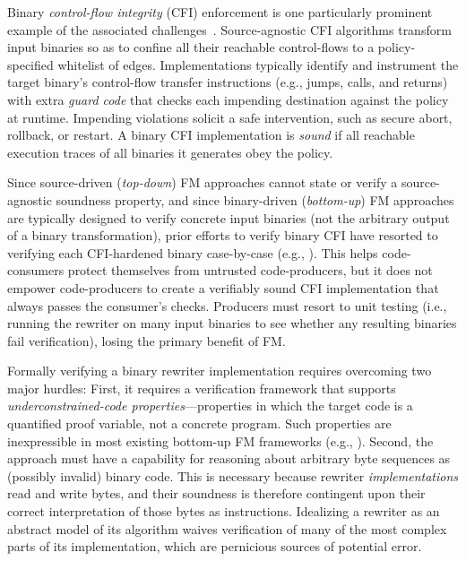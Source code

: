 {    Binary \emph{control-flow integrity} (CFI) enforcement is one particularly prominent example of the associated challenges~\cite{safedispatch,typearmor,object_flow_integrity,fineibt,renewablejitcfi,eccut,resource_constrained_cfi,fixingfineibt}.
    Source-agnostic CFI algorithms transform input binaries so as to confine all their reachable control-flows to a policy-specified whitelist of edges.
    Implementations typically identify and instrument the target binary's control-flow transfer instructions (e.g., jumps, calls, and returns) with extra \emph{guard code} that checks each impending destination against the policy at runtime.
    Impending violations solicit a safe intervention, such as secure abort, rollback, or restart.
    A binary CFI implementation is \emph{sound} if all reachable execution traces of all binaries it generates obey the policy.

    Since source-driven (\emph{top-down}) FM approaches cannot state or verify a source-agnostic soundness property, and since binary-driven (\emph{bottom-up}) FM approaches are typically designed to verify concrete input binaries (not the arbitrary output of a binary transformation), prior efforts to verify binary CFI have resorted to verifying each CFI-hardened binary case-by-case (e.g., \cite{rocksalt}).
    This helps code-consumers protect themselves from untrusted code-producers, but it does not empower code-producers to create a verifiably sound CFI implementation that always passes the consumer's checks.
    Producers must resort to unit testing (i.e., running the rewriter on many input binaries to see whether any resulting binaries fail verification), losing the primary benefit of FM\@.

    Formally verifying a binary rewriter implementation requires overcoming two major hurdles:
    First, it requires a verification framework that supports \emph{underconstrained-code properties}---properties in which the target code is a quantified proof variable, not a concrete program.
    Such properties are inexpressible in most existing bottom-up FM frameworks (e.g., \cite{trabin,isabil,islaris,myreen08,bjorn14}).
    Second, the approach must have a capability for reasoning about arbitrary byte sequences as (possibly invalid) binary code.
    This is necessary because rewriter \emph{implementations} read and write bytes, and their soundness is therefore contingent upon their correct interpretation of those bytes as instructions.
    Idealizing a rewriter as an abstract model of its algorithm waives verification of many of the most complex parts of its implementation, which are pernicious sources of potential error.

}
